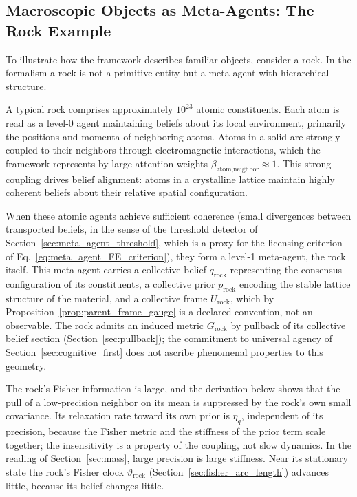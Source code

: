 \documentclass[11pt]{article}
\begin{document}
\subsection{Macroscopic Objects as Meta-Agents: The Rock Example}

To illustrate how the framework describes familiar objects, consider a rock. In the formalism a rock is not a primitive entity but a meta-agent with hierarchical structure.

A typical rock comprises approximately $10^{23}$ atomic constituents. Each atom is read as a level-0 agent maintaining beliefs about its local environment, primarily the positions and momenta of neighboring atoms. Atoms in a solid are strongly coupled to their neighbors through electromagnetic interactions, which the framework represents by large attention weights $\beta_{\text{atom,neighbor}} \approx 1$. This strong coupling drives belief alignment: atoms in a crystalline lattice maintain highly coherent beliefs about their relative spatial configuration.

When these atomic agents achieve sufficient coherence (small divergences between transported beliefs, in the sense of the threshold detector of Section~\ref{sec:meta_agent_threshold}, which is a proxy for the licensing criterion of Eq.~\eqref{eq:meta_agent_FE_criterion}), they form a level-1 meta-agent, the rock itself. This meta-agent carries a collective belief $q_{\text{rock}}$ representing the consensus configuration of its constituents, a collective prior $p_{\text{rock}}$ encoding the stable lattice structure of the material, and a collective frame $U_{\text{rock}}$, which by Proposition~\ref{prop:parent_frame_gauge} is a declared convention, not an observable. The rock admits an induced metric $G_{\text{rock}}$ by pullback of its collective belief section (Section~\ref{sec:pullback}); the commitment to universal agency of Section~\ref{sec:cognitive_first} does not ascribe phenomenal properties to this geometry.

The rock's Fisher information is large, and the derivation below shows that the pull of a low-precision neighbor on its mean is suppressed by the rock's own small covariance. Its relaxation rate toward its own prior is $\eta_q$, independent of its precision, because the Fisher metric and the stiffness of the prior term scale together; the insensitivity is a property of the coupling, not slow dynamics. In the reading of Section~\ref{sec:mass}, large precision is large stiffness. Near its stationary state the rock's Fisher clock $\vartheta_{\text{rock}}$ (Section~\ref{sec:fisher_arc_length}) advances little, because its belief changes little.
\end{document}
